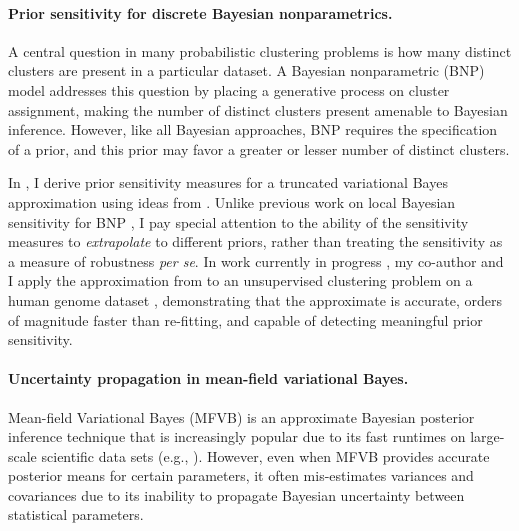 \paragraph{Prior sensitivity for discrete Bayesian nonparametrics.}

A central question in many probabilistic clustering problems is how many
distinct clusters are present in a particular dataset. A Bayesian nonparametric
(BNP) model addresses this question by placing a generative process on cluster
assignment, making the number of distinct clusters present amenable to Bayesian
inference.  However, like all Bayesian approaches, BNP requires the
specification of a prior, and this prior may favor a greater or lesser number of
distinct clusters.

In \citep{giordano:2018:bnpsensitivity}, I derive prior sensitivity measures for
a truncated variational Bayes approximation using ideas from
\citep{gustafson:1996:localposterior, giordano:2018:covariances}. Unlike
previous work on local Bayesian sensitivity for BNP
\citep{Basu:2000:BNP_robustness}, I pay special attention to the ability of the
sensitivity measures to \emph{extrapolate} to different priors, rather than
treating the sensitivity as a measure of robustness \textit{per se}. In work
currently in progress \citep{liu:2020:bnpjisba}, my co-author and I apply the
approximation from \citep{giordano:2018:bnpsensitivity} to an unsupervised
clustering problem on a human genome dataset \citep{huang:2011:haplotype,
raj:2014:faststructure}, demonstrating that the approximate is accurate, orders
of magnitude faster than re-fitting, and capable of detecting meaningful prior
sensitivity.


\paragraph{Uncertainty propagation in mean-field variational Bayes.}

Mean-field Variational Bayes (MFVB) is an approximate Bayesian posterior
inference technique that is increasingly popular due to its fast runtimes on
large-scale scientific data sets (e.g., \citet{raj:2014:faststructure,
kucukelbir:2017:advi, regier:2019:cataloging}). However, even when MFVB provides
accurate posterior means for certain parameters, it often mis-estimates
variances and covariances \citep{wang:2005:inadequacy, turner:2011:two} due to
its inability to propagate Bayesian uncertainty between statistical parameters.

